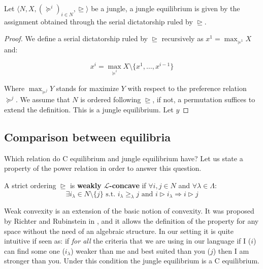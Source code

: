 \begin{proposition}
    Let $\langle N,X,(\succeq^i)_{i\in N}, \trianglerighteq\rangle$ be a jungle, a jungle equilibrium is given by the assignment obtained through the serial dictatorship ruled by $\trianglerighteq$.

    \begin{proof}
        We define a serial dictatorship ruled by $\trianglerighteq$ recursively as $x^1=\max_{\succeq^1}X$ and:

        \[x^i=\max_{\succeq^i}X\setminus\{x^1,\dots,x^{i-1}\}\]

        Where $\max_{\succeq^j}Y$ stands for maximize $Y$ with respect to the preference relation $\succeq^j$. We assume that $N$ is ordered following $\trianglerighteq$, if not, a permutation suffices to extend the definition. This is a jungle equilibrium. Let $y$ 
    \end{proof}
\end{proposition}

\subsection{Comparison between equilibria}

Which relation do C equilibrium and jungle equilibrium have? Let us state a property of the power relation in order to answer this question. 

\begin{definition}
    A strict ordering $\trianglerighteq$ is \textbf{weakly} $\mathcal{L}$\textbf{-concave} if $\forall i,j\in N$ and $\forall\lambda\in\Lambda$:
    \[\exists i_{\lambda}\in N\setminus\{j\} \text{ s.t. } i_{\lambda}\geq_{\lambda}j \text{ and } i\triangleright i_{\lambda} \Rightarrow i\triangleright j\]
\end{definition}

Weak convexity is an extension of the basic notion of convexity. It was proposed by Richter and Rubinstein in \cite[RR]{Convex_Pref}, and it allows the definition of the property for any space without the need of an algebraic structure. In our setting it is quite intuitive if seen as: if \textit{for all} the criteria that we are using in our language if I ($i$) can find some one ($i_{\lambda}$) weaker than me and best suited than you ($j$) then I am stronger than you. Under this condition the jungle equilibrium is a C equilibrium.


